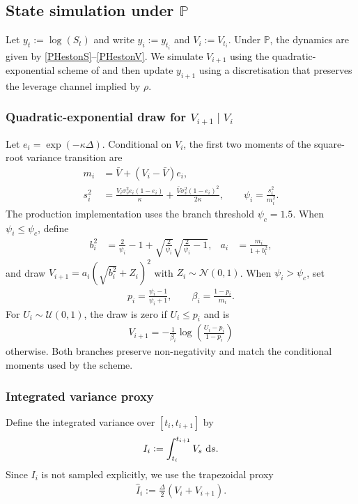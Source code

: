 \documentclass[11pt,a4paper,notitlepage]{article}
\numberwithin{equation}{section}
\begin{document}
\subsection{State simulation under $\mathbb{P}$}
Let $y_t:=\log(S_t)$ and write $y_i:=y_{t_i}$ and $V_i:=V_{t_i}$. Under $\mathbb{P}$,
the dynamics are given by \eqref{PHestonS}--\eqref{PHestonV}.
We simulate $V_{i+1}$ using the quadratic-exponential scheme of \citet{andersen2008simple} and then update $y_{i+1}$ using a discretisation that preserves the leverage channel implied by $\rho$.

\subsubsection{Quadratic-exponential draw for $V_{i+1}\mid V_i$}
Let $e_i=\exp(-\kappa\Delta)$. Conditional on $V_i$, the first two moments of the square-root variance transition are
\begin{align}
m_i &= \bar V+(V_i-\bar V)e_i, \\
s_i^2 &= \frac{V_i\sigma_v^2e_i(1-e_i)}{\kappa}
+\frac{\bar V\sigma_v^2(1-e_i)^2}{2\kappa},
\qquad
\psi_i=\frac{s_i^2}{m_i^2}.
\label{eq:qe_moments}
\end{align}
The production implementation uses the branch threshold $\psi_c=1.5$. When $\psi_i\leq\psi_c$, define
\begin{align}
b_i^2&=\frac{2}{\psi_i}-1+\sqrt{\frac{2}{\psi_i}}\sqrt{\frac{2}{\psi_i}-1},
&a_i&=\frac{m_i}{1+b_i^2},
\end{align}
and draw $V_{i+1}=a_i(\sqrt{b_i^2}+Z_i)^2$ with $Z_i\sim\mathcal N(0,1)$. When $\psi_i>\psi_c$, set
\begin{align}
p_i=\frac{\psi_i-1}{\psi_i+1},
\qquad
\beta_i=\frac{1-p_i}{m_i}.
\end{align}
For $U_i\sim\mathcal U(0,1)$, the draw is zero if $U_i\leq p_i$ and is
\begin{align}
V_{i+1}=-\frac{1}{\beta_i}\log\left(\frac{U_i-p_i}{1-p_i}\right)
\end{align}
otherwise. Both branches preserve non-negativity and match the conditional moments used by the scheme.

\subsubsection{Integrated variance proxy}
Define the integrated variance over $[t_i,t_{i+1}]$ by
\begin{align}
I_i := \int_{t_i}^{t_{i+1}} V_s\,\dif s.
\end{align}
Since $I_i$ is not sampled explicitly, we use the trapezoidal proxy
\begin{align}
\widehat{I}_i := \frac{\Delta}{2}\left(V_i+V_{i+1}\right).
\label{eq:I_trap}
\end{align}
\end{document}
